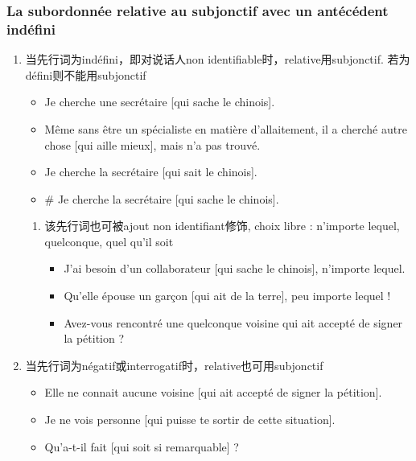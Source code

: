 \documentclass[UTF8]{report}
\begin{document}
\subsubsection{La subordonnée relative au subjonctif avec un antécédent indéfini}
\begin{enumerate}
    \item 当先行词为indéfini，即对说话人non identifiable时，relative用subjonctif. 若为défini则不能用subjonctif
    \begin{itemize}
        \item Je cherche une secrétaire [qui sache le chinois].
        \item Même sans être un spécialiste en matière d’allaitement, il a cherché autre chose [qui aille mieux], mais n’a pas trouvé.
        \item Je cherche la secrétaire [qui sait le chinois].
        \item \# Je cherche la secrétaire [qui sache le chinois].
    \end{itemize}
    \begin{enumerate}
        \item 该先行词也可被ajout non identifiant修饰, choix libre : n’importe lequel, quelconque, quel qu’il soit
        \begin{itemize}
            \item J’ai besoin d’un collaborateur [qui sache le chinois], n’importe lequel.
            \item Qu’elle épouse un garçon [qui ait de la terre], peu importe lequel !
            \item Avez-vous rencontré une quelconque voisine qui ait accepté de signer la pétition ?
        \end{itemize}
    \end{enumerate}
    \item 当先行词为négatif或interrogatif时，relative也可用subjonctif
    \begin{itemize}
        \item Elle ne connait aucune voisine [qui ait accepté de signer la pétition].
        \item Je ne vois personne [qui puisse te sortir de cette situation].
        \item Qu’a-t-il fait [qui soit si remarquable] ?
    \end{itemize}
\end{enumerate}
\end{document}
